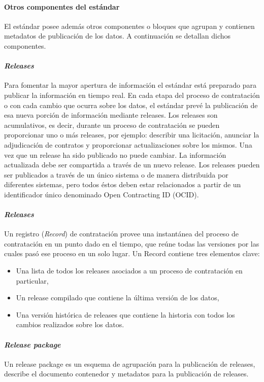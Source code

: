 \paragraph{Otros componentes del estándar}\hfill \break
El estándar posee además otros componentes o bloques que agrupan y contienen metadatos de publicación de los datos.  A continuación se detallan dichos componentes.

\paragraph{\textit{Releases}}\hfill \break
Para fomentar la mayor apertura de información el estándar está preparado para publicar la información en tiempo real. En cada etapa del proceso de contratación o con cada cambio que ocurra sobre los datos, el estándar prevé la publicación de esa nueva porción de información mediante releases.
Los releases son acumulativos, es decir, durante un proceso de contratación se pueden proporcionar uno o más releases, por ejemplo: describir una licitación, anunciar la adjudicación de contratos y proporcionar actualizaciones sobre los mismos.
Una vez que un release ha sido publicado no puede cambiar. La información actualizada debe ser compartida a través de un nuevo release.
Los releases pueden ser publicados a través de un único sistema o de manera distribuida por diferentes sistemas, pero todos éstos deben estar relacionados a partir de un identificador único denominado Open Contracting ID (OCID).

\paragraph{\textit{Releases}}\hfill \break
Un registro (\textit{Record}) de contratación provee una instantánea del proceso de contratación en un punto dado en el tiempo, que reúne todas las versiones por las cuales pasó ese proceso en un solo lugar.
Un Record contiene tres elementos clave: 
\begin{itemize}
    \item Una lista de todos los releases asociados a un proceso de contratación en particular, 
    \item Un release compilado que contiene la última versión de los datos,
    \item Una versión histórica de releases que contiene la historia con todos los cambios realizados sobre los datos.
\end{itemize}

\paragraph{\textit{Release package}}\hfill \break
Un release package es un esquema de agrupación para la publicación de releases, describe el documento contenedor y metadatos para la publicación de releases.

